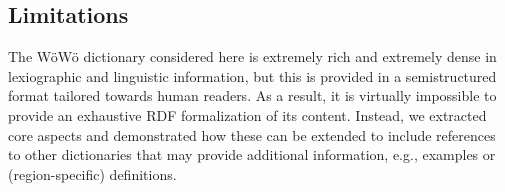 \documentclass[11pt]{article}
\begin{document}
\begin{enumerate}
% 
%
%
%

\section*{Limitations}


The WöWö dictionary considered here is extremely rich and extremely dense in lexiographic and linguistic information, but this is provided in a semistructured format tailored towards human readers. As a result, it is virtually impossible to provide an exhaustive RDF formalization of its content. Instead, we extracted core aspects and demonstrated how these can be extended to include references to other dictionaries that may provide additional information, e.g., examples or (region-specific) definitions.


\end{enumerate}
\end{document}
